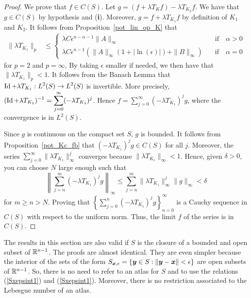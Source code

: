 \begin{proof}
 We prove that $f \in C(S)$.
Let $g = (f+ \lambda T_K f) - \lambda T_{K_2} f$.  We have that $g \in C(S)$
by hypothesis and ({\bfseries i}).  Moreover, $g=f+ \lambda T_{K_1} f$ by
definition of $K_1$ and $K_2$.  It follows from
Proposition~\ref{pot_lin_op_K} that
\begin{align*}
\| \lambda T_{K_1} \|_p & \leq
\begin{cases}
\lambda C \epsilon^{n-\alpha-1} \|A\|_{\infty} & \quad \text{if} \quad
\alpha>0 \\
\lambda C \epsilon^{n-1} \left( \|A\|_{\infty}
\left( 1 + |\ln(\epsilon)|\right) + \|B\|_\infty \right) & \quad \text{if} \quad
\alpha=0
\end{cases}
\end{align*}
for $p=2$ and $p=\infty$,  By taking $\epsilon$ smaller if needed, we
then have that $\displaystyle \| \lambda T_{K_1} \|_p < 1$.
It follows from
the Banach Lemma that
$\displaystyle \operatorname{Id} + \lambda T_{K_1}:L^2(S) \rightarrow L^2(S)$ is
invertible.  More precisely,
$\displaystyle (\operatorname{Id} + \lambda T_{K_1})^{-1} = \sum_{j=0}^\infty
(-\lambda T_{K_1})^j$.
Hence $\displaystyle f = \sum_{j=0}^\infty (-\lambda T_{K_1})^j g$, where the
convergence is in $\displaystyle L^2(S)$.

Since $g$ is continuous on the compact set $S$, $g$ is bounded.  It
follows from Proposition~\ref{pot_Kc_fb} that
$(-\lambda T_{K_1})^j g\in C(S)$ for all $j$.  Moreover, the series
$\displaystyle \sum_{j=0}^\infty \|\lambda T_{K_1}\|_\infty^j$
converges because $\|\lambda T_{K_1}\|_\infty <1$.  Hence,
given $\delta>0$, you can choose $N$ large enough such that
\[
\left\| \sum_{j=n}^m (-\lambda T_{K_1})^j g \right\|_\infty \leq
\sum_{j=n}^m \|\lambda T_{K_1}\|_\infty^j \|g\|_\infty < \delta
\]
for $m\geq n >N$.  Proving that
$\displaystyle
\left\{ \sum_{j=0}^n (-\lambda T_{K_1})^j g \right\}_{n=0}^\infty$ is a
Cauchy sequence in $C(S)$ with respect to the uniform norm.  Thus, the
limit $f$ of the series is in $C(S)$.
\end{proof}

\begin{rmk}
The results in this section are also valid if $S$
is the closure of a bounded and open subset of $\mathbb{R}^{n-1}$.
The proofs are almost identical.  They are even simpler because
the interior of the sets of the form
$\displaystyle S_{{\bm{x}},\epsilon} = \left\{{\bm{y}} \in S :
\|{\bm{y}}-{\bm{x}}\| < \epsilon \right\}$ are open subsets of $\mathbb{R}^{n-1}$.
So, there is no need to refer to an atlas for $S$ and to use the
relations (\ref{Sxepsint1}) and (\ref{Sxepsint1}).  Moreover, there is
no restriction associated to the Lebesgue number of an atlas.
\end{rmk}

